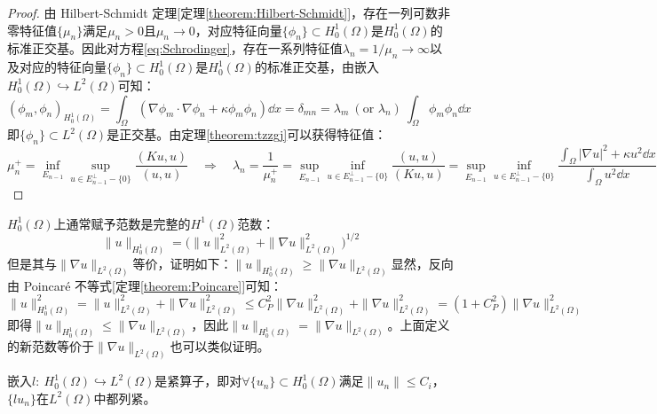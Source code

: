 \begin{proof}
由 Hilbert-Schmidt 定理[定理\ref{theorem:Hilbert-Schmidt}]，存在一列可数非零特征值$\{\mu_n\}$满足$\mu_n>0$且$\mu_n \to 0$，对应特征向量$\{\phi_n\} \subset H_0^1(\Omega)$是$H_0^1(\Omega)$的标准正交基。因此对方程\eqref{eq:Schrodinger}，存在一系列特征值$\lambda_n=1/\mu_n \to \infty$以及对应的特征向量$\{\phi_n\} \subset H_0^1(\Omega)$是$H_0^1(\Omega)$的标准正交基，由嵌入$H_0^1(\Omega) \hookrightarrow L^2(\Omega)$可知：
\[(\phi_m,\phi_n)_{H_0^1(\Omega)}=\int_{\Omega}(\nabla \phi_m\cdot\nabla \phi_n+\kappa \phi_m\phi_n)\dd{x}=\delta_{mn}=\lambda_m \ (\text{or } \lambda_n) \ \int_{\Omega}\phi_m\phi_n\dd{x}\]
即$\{\phi_n\} \subset L^2(\Omega)$是正交基。由定理\ref{theorem:tzzgj}可以获得特征值：
\[\mu_n^+=\inf_{E_{n-1}}\sup_{u \in E_{n-1}^{\perp}-\{0\}}\frac{(Ku,u)}{(u,u)} \quad \Rightarrow \quad \lambda_n=\frac{1}{\mu_n^+}=\sup_{E_{n-1}}\inf_{u \in E_{n-1}^{\perp}-\{0\}}\frac{(u,u)}{(Ku,u)}=\sup_{E_{n-1}}\inf_{u \in E_{n-1}^{\perp}-\{0\}}\frac{\int_{\Omega}|\nabla u|^2+\kappa u^2\dd{x}}{\int_{\Omega}u^2\dd{x}}\]
\end{proof}

\begin{remark}
\quad $H_0^1(\Omega)$上通常赋予范数是完整的$H^1(\Omega)$范数：
\[\|u\|_{H_0^1(\Omega)} = \bigl( \|u\|_{L^2(\Omega)}^2 + \|\nabla u\|_{L^2(\Omega)}^2 \bigr)^{1/2}\]
但是其与$\|\nabla u\|_{L^2(\Omega)}$等价，证明如下：$\|u\|_{H_0^1(\Omega)} \geq \|\nabla u\|_{L^2(\Omega)}$显然，反向由 Poincar\'{e} 不等式[定理\ref{theorem:Poincare}]可知：
\[\|u\|_{H_0^1(\Omega)}^2 = \|u\|_{L^2(\Omega)}^2 + \|\nabla u\|_{L^2(\Omega)}^2 \le C_P^2 \|\nabla u\|_{L^2(\Omega)}^2 + \|\nabla u\|_{L^2(\Omega)}^2 = (1 + C_P^2) \|\nabla u\|_{L^2(\Omega)}^2\]
即得$\|u\|_{H_0^1(\Omega)} \leq \|\nabla u\|_{L^2(\Omega)}$，因此$\|u\|_{H_0^1(\Omega)}=\|\nabla u\|_{L^2(\Omega)}$。上面定义的新范数等价于$\|\nabla u\|_{L^2(\Omega)}$也可以类似证明。
\end{remark}
\newpage

\begin{theorem}\label{theorem:Rellich–Kondrachov}
嵌入$l: \ H_0^1(\Omega) \hookrightarrow L^2(\Omega)$是紧算子，即对$\forall \{u_n\} \subset H_0^1(\Omega)$满足$\|u_n\| \leq C_i$，$\{lu_n\}$在$L^2(\Omega)$中都列紧。
\end{theorem}

